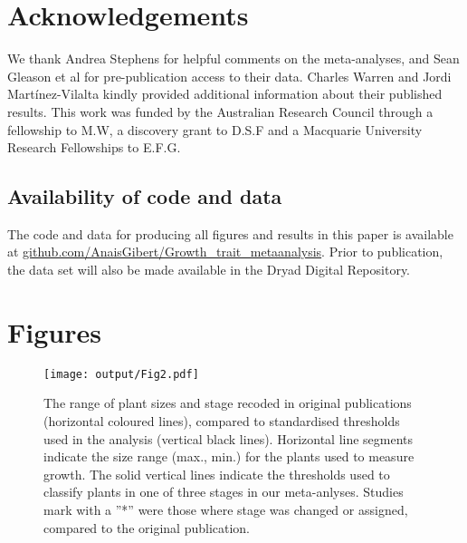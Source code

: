 \documentclass[a4paper,11pt]{article}
\newcommand{\smurl}[1]{\url{#1}}
\begin{document}
\section*{Acknowledgements}\label{Acknowledgment}

We thank Andrea Stephens for helpful comments on the meta-analyses, and Sean Gleason et al for pre-publication access to their data. Charles Warren and Jordi Mart{\'i}nez-Vilalta kindly provided additional information about their published results. This work was funded by the Australian Research Council through a fellowship to M.W, a discovery grant to D.S.F and a Macquarie University Research Fellowships to E.F.G.

\subsection*{Availability of code and data}\label{code}

The code and data for producing all figures and results in this paper is available at \smurl{github.com/AnaisGibert/Growth\_trait\_metaanalysis}. Prior to publication, the data set will also be made available in the Dryad Digital Repository.

\clearpage
\linespread{1}

\label{references}

\clearpage
\section*{Figures}

\begin{figure}[h!]
\centering
\texttt{[image: output/Fig2.pdf]}
\caption{The range of plant sizes and stage recoded in original publications (horizontal coloured lines), compared to standardised thresholds used in the analysis (vertical black lines). Horizontal line segments indicate the size range (max., min.) for the plants used to measure growth. The solid vertical lines indicate the thresholds used to classify plants in one of three stages in our meta-anlyses. Studies mark with a ''*'' were those where stage was changed or assigned, compared to the original publication. }
\label{fig:fig2}
\end{figure}
\end{document}
